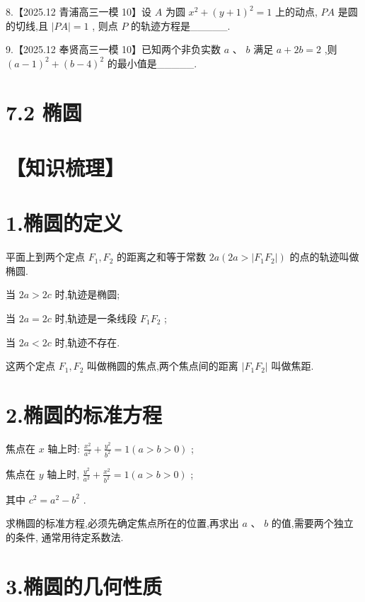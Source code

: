 \documentclass[10pt]{article}
\begin{document}
8.【2025.12 青浦高三一模 10】设 \(A\) 为圆 \({x}^{2} + {\left( y + 1\right) }^{2} = 1\) 上的动点, \({PA}\) 是圆的切线,且 \(\left| {PA}\right|  = 1\) , 则点 \(P\) 的轨迹方程是\_\_\_\_\_.

9.【2025.12 奉贤高三一模 10】已知两个非负实数 \(a\text{ 、 }b\) 满足 \(a + {2b} = 2\) ,则 \({\left( a - 1\right) }^{2} + {\left( b - 4\right) }^{2}\) 的最小值是\_\_\_\_\_.

\section*{7.2 椭圆}

\section*{【知识梳理】}

\section*{1.椭圆的定义}

平面上到两个定点 \({F}_{1},{F}_{2}\) 的距离之和等于常数 \({2a}\left( {{2a} > \left| {{F}_{1}{F}_{2}}\right| }\right)\) 的点的轨迹叫做椭圆.

当 \({2a} > {2c}\) 时,轨迹是椭圆;

当 \({2a} = {2c}\) 时,轨迹是一条线段 \({F}_{1}{F}_{2}\) ;

当 \({2a} < {2c}\) 时,轨迹不存在.

这两个定点 \({F}_{1},{F}_{2}\) 叫做椭圆的焦点,两个焦点间的距离 \(\left| {{F}_{1}{F}_{2}}\right|\) 叫做焦距.

\section*{2.椭圆的标准方程}

焦点在 \(x\) 轴上时: \(\frac{{x}^{2}}{{a}^{2}} + \frac{{y}^{2}}{{b}^{2}} = 1\left( {a > b > 0}\right)\) ;

焦点在 \(y\) 轴上时, \(\frac{{y}^{2}}{{a}^{2}} + \frac{{x}^{2}}{{b}^{2}} = 1\left( {a > b > 0}\right)\) ;

其中 \({c}^{2} = {a}^{2} - {b}^{2}\) .

求椭圆的标准方程,必须先确定焦点所在的位置,再求出 \(a\text{ 、 }b\) 的值,需要两个独立的条件, 通常用待定系数法.

\section*{3.椭圆的几何性质}
\end{document}
